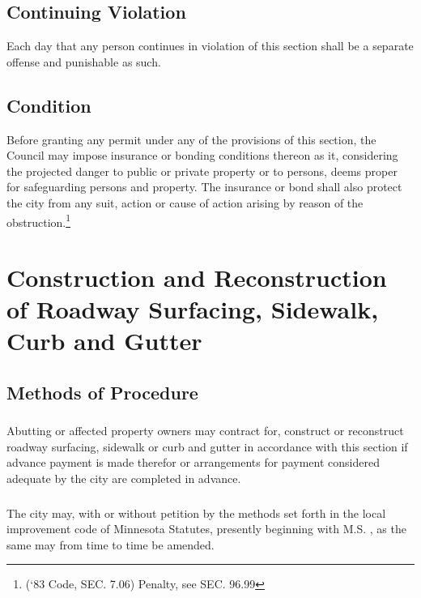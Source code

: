\subsection{Continuing Violation}
Each day that any person continues in violation of this section shall be a separate offense and punishable as such.
\subsection{Condition}
Before granting any permit under any of the provisions of this section, the Council may impose insurance or bonding conditions thereon as it, considering the projected danger to public or private property or to persons, deems proper for safeguarding persons and property.  The insurance or bond shall also protect the city from any suit, action or cause of action arising by reason of the obstruction.\footnote{(‘83 Code, SEC. 7.06)  Penalty, see SEC. 96.99}
\section{Construction and Reconstruction of Roadway Surfacing, Sidewalk, Curb and Gutter}
\subsection{Methods of Procedure}
\subsubsection{}
Abutting or affected property owners may contract for, construct or reconstruct roadway surfacing, sidewalk or curb and gutter in accordance with this section if advance payment is made therefor or arrangements for payment considered adequate by the city are completed in advance.
\subsubsection{}
The city may, with or without petition by the methods set forth in the local improvement code of Minnesota Statutes, presently beginning with M.S. , as the same may from time to time be amended.
